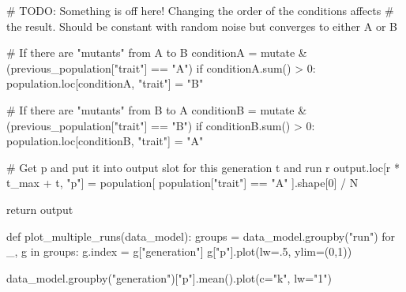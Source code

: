 \documentclass[
  a4paperpaper,
  ,captions=tableheading
]{scrbook}
\newenvironment{Shaded}{\begin{snugshade}}{\end{snugshade}}
\newcommand{\AlertTok}[1]{\textcolor[rgb]{0.68,0.00,0.00}{#1}}
\newcommand{\BuiltInTok}[1]{\textcolor[rgb]{0.00,0.23,0.31}{#1}}
\newcommand{\CommentTok}[1]{\textcolor[rgb]{0.37,0.37,0.37}{#1}}
\newcommand{\ControlFlowTok}[1]{\textcolor[rgb]{0.00,0.23,0.31}{#1}}
\newcommand{\DecValTok}[1]{\textcolor[rgb]{0.68,0.00,0.00}{#1}}
\newcommand{\FloatTok}[1]{\textcolor[rgb]{0.68,0.00,0.00}{#1}}
\newcommand{\KeywordTok}[1]{\textcolor[rgb]{0.00,0.23,0.31}{#1}}
\newcommand{\NormalTok}[1]{\textcolor[rgb]{0.00,0.23,0.31}{#1}}
\newcommand{\OperatorTok}[1]{\textcolor[rgb]{0.37,0.37,0.37}{#1}}
\newcommand{\StringTok}[1]{\textcolor[rgb]{0.13,0.47,0.30}{#1}}
\begin{document}
\begin{Shaded}
\begin{Highlighting}[]
            \CommentTok{\# }\AlertTok{TODO}\CommentTok{: Something is off here! Changing the order of the conditions affects}
            \CommentTok{\# the result. Should be constant with random noise but converges to either A or B}

            \CommentTok{\# If there are "mutants" from A to B }
\NormalTok{            conditionA }\OperatorTok{=}\NormalTok{ mutate }\OperatorTok{\&}\NormalTok{ (previous\_population[}\StringTok{"trait"}\NormalTok{] }\OperatorTok{==} \StringTok{"A"}\NormalTok{)}
            \ControlFlowTok{if}\NormalTok{ conditionA.}\BuiltInTok{sum}\NormalTok{() }\OperatorTok{\textgreater{}} \DecValTok{0}\NormalTok{:}
\NormalTok{                population.loc[conditionA, }\StringTok{"trait"}\NormalTok{] }\OperatorTok{=} \StringTok{"B"}

            \CommentTok{\# If there are "mutants" from B to A}
\NormalTok{            conditionB }\OperatorTok{=}\NormalTok{ mutate }\OperatorTok{\&}\NormalTok{ (previous\_population[}\StringTok{"trait"}\NormalTok{] }\OperatorTok{==} \StringTok{"B"}\NormalTok{)}
            \ControlFlowTok{if}\NormalTok{ conditionB.}\BuiltInTok{sum}\NormalTok{() }\OperatorTok{\textgreater{}} \DecValTok{0}\NormalTok{:}
\NormalTok{                population.loc[conditionB, }\StringTok{"trait"}\NormalTok{] }\OperatorTok{=} \StringTok{"A"}

            \CommentTok{\# Get p and put it into output slot for this generation t and run r}
\NormalTok{            output.loc[r }\OperatorTok{*}\NormalTok{ t\_max }\OperatorTok{+}\NormalTok{ t, }\StringTok{"p"}\NormalTok{] }\OperatorTok{=}\NormalTok{ population[ population[}\StringTok{"trait"}\NormalTok{] }\OperatorTok{==} \StringTok{"A"}\NormalTok{ ].shape[}\DecValTok{0}\NormalTok{] }\OperatorTok{/}\NormalTok{ N}

    \ControlFlowTok{return}\NormalTok{ output }
\end{Highlighting}
\end{Shaded}

\begin{Shaded}
\begin{Highlighting}[]
\KeywordTok{def}\NormalTok{ plot\_multiple\_runs(data\_model):}
\NormalTok{    groups }\OperatorTok{=}\NormalTok{ data\_model.groupby(}\StringTok{"run"}\NormalTok{)}
    \ControlFlowTok{for}\NormalTok{ \_, g }\KeywordTok{in}\NormalTok{ groups:}
\NormalTok{        g.index }\OperatorTok{=}\NormalTok{ g[}\StringTok{"generation"}\NormalTok{]}
\NormalTok{        g[}\StringTok{"p"}\NormalTok{].plot(lw}\OperatorTok{=}\FloatTok{.5}\NormalTok{, ylim}\OperatorTok{=}\NormalTok{(}\DecValTok{0}\NormalTok{,}\DecValTok{1}\NormalTok{))}

\NormalTok{    data\_model.groupby(}\StringTok{"generation"}\NormalTok{)[}\StringTok{"p"}\NormalTok{].mean().plot(c}\OperatorTok{=}\StringTok{"k"}\NormalTok{, lw}\OperatorTok{=}\StringTok{"1"}\NormalTok{)}
\end{Highlighting}
\end{Shaded}
\end{document}
